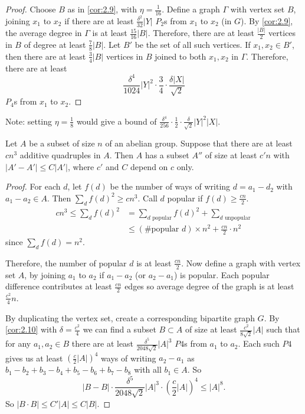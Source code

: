 \documentclass{article}
\newcommand{\1}[1]{\mathbbm{1}_{#1}}
\begin{document}
\begin{proof}
  Choose $B$ as in \cref{cor:2.9}, with $\eta = \frac{1}{16}$.
  Define a graph $\Gamma$ with vertex set $B$, joining $x_1$ to $x_2$ if there are at least $\frac{\delta^2}{32}|Y|$ $P_2$s from $x_1$ to $x_2$ (in $G$).
  By \cref{cor:2.9}, the average degree in $\Gamma$ is at least $\frac{15}{16}|B|$.
  Therefore, there are at least $\frac{|B|}{2}$ vertices in $B$ of degree at least $\frac{7}{8} |B|$.
  Let $B'$ be the set of all such vertices.
  If $x_1, x_2 \in B'$, then there are at least $\frac{3}{4} |B|$ vertices in $B$ joined to both $x_1, x_2$ in $\Gamma$.
  Therefore, there are at least
  \begin{equation*}
    \frac{\delta^4}{1024} |Y|^2 \cdot \frac{3}{4} \cdot \frac{\delta|X|}{\sqrt 2}
  \end{equation*}
  $P_4$s from $x_1$ to $x_2$.
\end{proof}
Note: setting $\eta = \frac{1}{8}$ would give a bound of $\frac{\delta^4}{256} \cdot \frac{1}{2} \cdot \frac{\delta}{\sqrt{2}} |Y|^2 |X|$.
\begin{nlemma}\label{lem:2.11}
  Let $A$ be a subset of size $n$ of an abelian group.
  Suppose that there are at least $c n^3$ additive quadruples in $A$.
  Then $A$ has a subset $A''$ of size at least $c'n$ with $|A' - A'| \leq C |A'|$, where $c'$ and $C$ depend on $c$ only.
\end{nlemma}
\begin{proof}
  For each $d$, let $f(d)$ be the number of ways of writing $d = a_1 - d_2$ with $a_1 - a_2 \in A$. Then $\sum_d f(d)^2 \geq c n^3$.
  Call $d$ popular if $f(d)\geq \frac{cn}{2}$.
  \begin{align*}
    cn^3 \leq \sum_d f(d)^2 &= \sum_{d \text{ popular}} f(d)^2 +  \sum_{d \text{ unpopular}} \\
                            &\leq (\# \text{popular } d) \times n^2 + \frac{cn}{2} \cdot n^2
  \end{align*}
  since $\sum_d f(d) = n^2$.

  Therefore, the number of popular $d$ is at least $\frac{cn}{2}$.
  Now define a graph with vertex set $A$, by joining $a_1$ to $a_2$ if $a_1-a_2$ (or $a_2 - a_1$) is popular.
  Each popular difference contributes at least $\frac{cn}{2}$ edges so average degree of the graph is at least $\frac{c^2}{4} n$.

  By duplicating the vertex set, create a corresponding bipartite graph $G$.
  By \cref{cor:2.10} with $\delta = \frac{c^2}{4}$ we can find a subset $B \subset A$ of size at least $\frac{c^2}{8 \sqrt{2}} |A|$ such that for any $a_1, a_2 \in B$ there are at least $\frac{\delta^5}{2048 \sqrt{2}} |A|^3$ $P4$s from $a_1$ to $a_2$.
  Each such $P4$ gives us at least $\left(\frac{c}{2} |A|\right)^4$ ways of writing $a_2 - a_1$ as $b_1 - b_2 + b_3 - b_4 + b_5 - b_6 + b_7 - b_8$ with all $b_1 \in A$.
  So
  \begin{equation*}
    |B - B| \cdot \frac{\delta^5}{2048 \sqrt{2}} |A|^3 \cdot \left(\frac{c}{2} |A|\right)^4 \leq |A|^8.
  \end{equation*}
  So $|B \cdot B| \leq C'|A| \leq C|B|$.
\end{proof}
\end{document}
